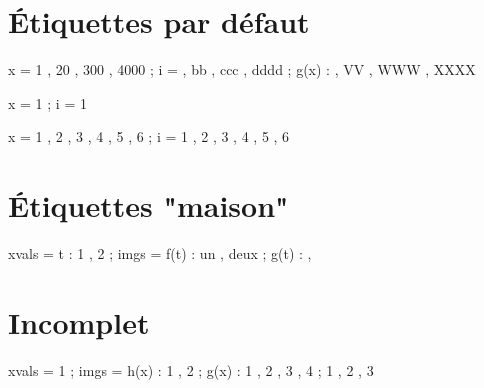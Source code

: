 \documentclass{tutodoc}
\begin{document}


\section{Étiquettes par défaut}

\begin{functable}
    x =        1           , 20 , 300 , 4000 ;
    i =         , bb , ccc , dddd ;
        g(x) :  , VV , WWW , XXXX
\end{functable}

\bigskip

\begin{functable}
    x = 1 ;
    i = 1
\end{functable}

\bigskip

\begin{functable}
    x = 1 , 2 , 3 , 4 , 5 , 6 ;
    i = 1 , 2 , 3 , 4 , 5 , 6
\end{functable}




\section{Étiquettes "maison"}

\begin{functable}
    xvals =    t : 1        , 2        ;
    imgs  = f(t) : un       , deux     ;
            g(t) :  , 
\end{functable}




\section{Incomplet}

\begin{functable}
    xvals =        1             ;
    imgs  = h(x) : 1 , 2         ;
            g(x) : 1 , 2 , 3 , 4 ;
                   1 , 2 , 3
\end{functable}
\end{document}
